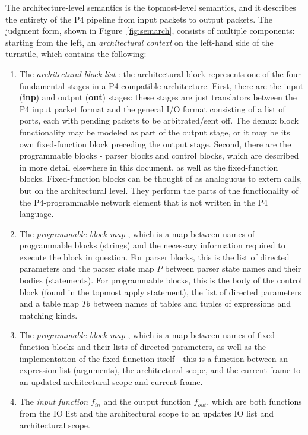 \documentclass[UTF8]{article}
\begin{document}
The architecture-level semantics is the topmost-level semantics, and it describes the entirety of the P4 pipeline from input packets to output packets. The judgment form, shown in Figure~\ref{fig:semarch}, consists of multiple components: starting from the left, an \emph{architectural context} \actx{} on the left-hand side of the turnstile, which contains the following:
\begin{enumerate}
\item The \emph{architectural block list} \abl{}: the architectural block represents one of the four fundamental stages in a P4-compatible architecture. First, there are the input (\textbf{inp}) and output (\textbf{out}) stages: these stages are just translators between the P4 input packet format and the general I/O format consisting of a list of ports, each with pending packets to be arbitrated/sent off. The demux block functionality may be modeled as part of the output stage, or it may be its own fixed-function block preceding the output stage. Second, there are the programmable blocks - parser blocks and control blocks, which are described in more detail elsewhere in this document, as well as the fixed-function blocks. Fixed-function blocks can be thought of as analoguous to extern calls, but on the architectural level. They perform the parts of the functionality of the P4-programmable network element that is not written in the P4 language.
\item The \emph{programmable block map} \pbm{}, which is a map between names of programmable blocks (strings) and the necessary information required to execute the block in question. For parser blocks, this is the list of directed parameters and the parser state map $P$ between parser state names and their bodies (statements). For programmable blocks, this is the body of the control block (found in the topmost apply statement), the list of directed parameters and a table map $\mathit{Tb}$ between names of tables and tuples of expressions and matching kinds.
\item The \emph{programmable block map} \ffbm{}, which is a map between names of fixed-function blocks and their lists of directed parameters, as well as the implementation of the fixed fiunction itself - this is a function between an expression list (arguments), the architectural scope, and the current frame to an updated architectural scope and current frame.
\item The \emph{input function} $f_{ \mathit{in} }$ and the output function $f_{ \mathit{out} }$, which are both functions from the IO list and the architectural scope to an updates IO list and architectural scope.

\end{enumerate}
\end{document}
